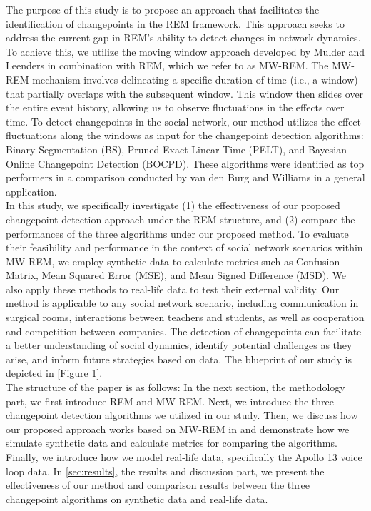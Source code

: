 \documentclass[]{interact}
\theoremstyle{plain}%
\theoremstyle{definition}
\theoremstyle{remark}
\begin{document}
{	The purpose of this study is to propose an approach that facilitates the identification of changepoints in the REM framework. This approach seeks to address the current gap in REM's ability to detect changes in network dynamics. To achieve this, we utilize the moving window approach developed by Mulder and Leenders \cite{mulderModelingEvolutionInteraction2019} in combination with REM, which we refer to as MW-REM. The MW-REM mechanism involves delineating a specific duration of time (i.e., a window) that partially overlaps with the subsequent window. This window then slides over the entire event history, allowing us to observe fluctuations in the effects over time. To detect changepoints in the social network, our method utilizes the effect fluctuations along the windows as input for the changepoint detection algorithms: Binary Segmentation (BS), Pruned Exact Linear Time (PELT), and Bayesian Online Changepoint Detection (BOCPD). These algorithms were identified as top performers in a comparison conducted by van den Burg and Williams \cite{burgEvaluationChangePoint2022} in a general application. \\
	
	In this study, we specifically investigate (1) the effectiveness of our proposed changepoint detection approach under the REM structure, and (2) compare the performances of the three algorithms under our proposed method. To evaluate their feasibility and performance in the context of social network scenarios within MW-REM, we employ synthetic data to calculate metrics such as Confusion Matrix, Mean Squared Error (MSE), and Mean Signed Difference (MSD). We also apply these methods to real-life data to test their external validity. Our method is applicable to any social network scenario, including communication in surgical rooms, interactions between teachers and students, as well as cooperation and competition between companies. The detection of changepoints can facilitate a better understanding of social dynamics, identify potential challenges as they arise, and inform future strategies based on data. The blueprint of our study is depicted in \autoref{Figure 1}. \\
	
    The structure of the paper is as follows: In the next section, the methodology part, we first introduce REM and MW-REM. Next, we introduce the three changepoint detection algorithms we utilized in our study. Then, we discuss how our proposed approach works based on MW-REM in and demonstrate how we simulate synthetic data and calculate metrics for comparing the algorithms. Finally, we introduce how we model real-life data, specifically the Apollo 13 voice loop data. In \autoref{sec:results}, the results and discussion part, we present the effectiveness of our method and comparison results between the three changepoint algorithms on synthetic data and real-life data.

}
\end{document}
